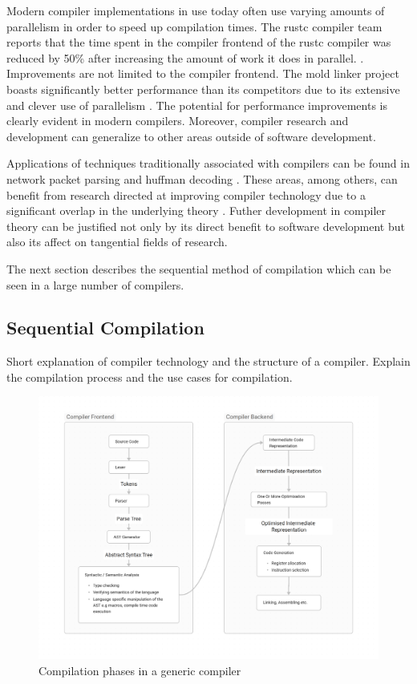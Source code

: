Modern compiler implementations in use today often use varying amounts of
parallelism in order to speed up compilation times. The rustc compiler team
reports that the time spent in the compiler frontend of the rustc compiler
was reduced by 50\% after increasing the amount of work it does in parallel.
\citep{nicholas_nethercote_faster_2023}. Improvements are not limited to
the compiler frontend. The mold linker project boasts significantly better
performance than its competitors due to its extensive and clever use of
parallelism \citep{rui_ueyama_design_nodate}. The potential for performance
improvements is clearly evident in modern compilers. Moreover, compiler research
and development can generalize to other areas outside of software development.

Applications of techniques traditionally associated with compilers
can be found in network packet parsing \citep{wang_hyperscan_2019,
roesch_snort_1999} and huffman decoding \citep{howard_parallel_1996}.
These areas, among others, can benefit from research directed at improving
compiler technology due to a significant overlap in the underlying theory
\citep{mytkowicz_data-parallel_2014}. Futher development in compiler theory can
be justified not only by its direct benefit to software development but also its
affect on tangential fields of research.

The next section describes the sequential method of compilation which can be
seen in a large number of compilers.

\subsection{Sequential Compilation}
\begin{sectionplan}
     Short explanation of compiler technology and the structure of a compiler.
     Explain the compilation process and the use cases for compilation.
\end{sectionplan}

\begin{figure}[t]
\includegraphics[width=\linewidth]{images/generic_compiler.png}
\centering
\caption{Compilation phases in a generic compiler}
\label{fig:compiler}
\end{figure}

